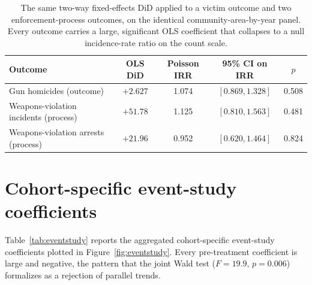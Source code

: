\documentclass[12pt]{article}
\begin{document}
\begin{table}[H]
\centering
\small
\caption{The same two-way fixed-effects DiD applied to a victim outcome and two
enforcement-process outcomes, on the identical community-area-by-year panel. Every outcome
carries a large, significant OLS coefficient that collapses to a null incidence-rate ratio
on the count scale.}
\label{tab:procedural}
\begin{tabular}{lcccc}
\toprule
Outcome & OLS DiD & Poisson IRR & 95\% CI on IRR & $p$ \\
\midrule
Gun homicides (outcome)               & $+2.627$ & 1.074 & $[0.869, 1.328]$ & 0.508 \\
Weapons-violation incidents (process) & $+51.78$ & 1.125 & $[0.810, 1.563]$ & 0.481 \\
Weapons-violation arrests (process)   & $+21.96$ & 0.952 & $[0.620, 1.464]$ & 0.824 \\
\bottomrule
\end{tabular}
\end{table}

\section{Cohort-specific event-study coefficients}
\label{app:eventstudy}

Table~\ref{tab:eventstudy} reports the aggregated cohort-specific event-study coefficients
plotted in Figure~\ref{fig:eventstudy}. Every pre-treatment coefficient is large and
negative, the pattern that the joint Wald test ($F = 19.9$, $p = 0.006$) formalizes as a
rejection of parallel trends.
\end{document}
